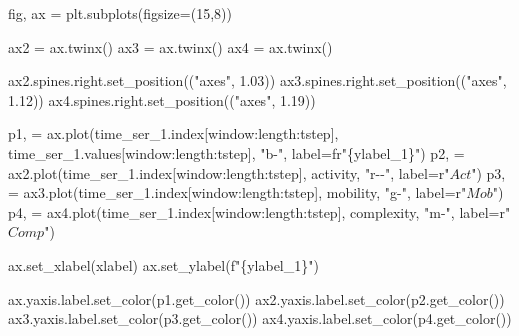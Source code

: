 \documentclass[
  letterpaper,
]{report}
\newenvironment{Shaded}{\begin{snugshade}}{\end{snugshade}}
\newcommand{\DecValTok}[1]{\textcolor[rgb]{0.68,0.00,0.00}{#1}}
\newcommand{\FloatTok}[1]{\textcolor[rgb]{0.68,0.00,0.00}{#1}}
\newcommand{\NormalTok}[1]{\textcolor[rgb]{0.00,0.23,0.31}{#1}}
\newcommand{\OperatorTok}[1]{\textcolor[rgb]{0.37,0.37,0.37}{#1}}
\newcommand{\SpecialCharTok}[1]{\textcolor[rgb]{0.37,0.37,0.37}{#1}}
\newcommand{\SpecialStringTok}[1]{\textcolor[rgb]{0.13,0.47,0.30}{#1}}
\newcommand{\StringTok}[1]{\textcolor[rgb]{0.13,0.47,0.30}{#1}}
\newcommand{\VerbatimStringTok}[1]{\textcolor[rgb]{0.13,0.47,0.30}{#1}}
\begin{document}
\begin{Shaded}
\begin{Highlighting}[]
\NormalTok{fig, ax }\OperatorTok{=}\NormalTok{ plt.subplots(figsize}\OperatorTok{=}\NormalTok{(}\DecValTok{15}\NormalTok{,}\DecValTok{8}\NormalTok{))}

\NormalTok{ax2 }\OperatorTok{=}\NormalTok{ ax.twinx()}
\NormalTok{ax3 }\OperatorTok{=}\NormalTok{ ax.twinx()}
\NormalTok{ax4 }\OperatorTok{=}\NormalTok{ ax.twinx()}

\NormalTok{ax2.spines.right.set\_position((}\StringTok{"axes"}\NormalTok{, }\FloatTok{1.03}\NormalTok{))}
\NormalTok{ax3.spines.right.set\_position((}\StringTok{"axes"}\NormalTok{, }\FloatTok{1.12}\NormalTok{))}
\NormalTok{ax4.spines.right.set\_position((}\StringTok{"axes"}\NormalTok{, }\FloatTok{1.19}\NormalTok{))}

\NormalTok{p1, }\OperatorTok{=}\NormalTok{ ax.plot(time\_ser\_1.index[window:length:tstep], }
\NormalTok{              time\_ser\_1.values[window:length:tstep], }
              \StringTok{"b{-}"}\NormalTok{, label}\OperatorTok{=}\VerbatimStringTok{fr"}\SpecialCharTok{\{}\NormalTok{ylabel\_1}\SpecialCharTok{\}}\VerbatimStringTok{"}\NormalTok{)}
\NormalTok{p2, }\OperatorTok{=}\NormalTok{ ax2.plot(time\_ser\_1.index[window:length:tstep], }
\NormalTok{               activity, }\StringTok{"r{-}{-}"}\NormalTok{, label}\OperatorTok{=}\VerbatimStringTok{r"$Act$"}\NormalTok{)}
\NormalTok{p3, }\OperatorTok{=}\NormalTok{ ax3.plot(time\_ser\_1.index[window:length:tstep], }
\NormalTok{               mobility, }\StringTok{"g{-}"}\NormalTok{, label}\OperatorTok{=}\VerbatimStringTok{r"$Mob$"}\NormalTok{)}
\NormalTok{p4, }\OperatorTok{=}\NormalTok{ ax4.plot(time\_ser\_1.index[window:length:tstep],}
\NormalTok{               complexity, }\StringTok{"m{-}"}\NormalTok{, label}\OperatorTok{=}\VerbatimStringTok{r"$Comp$"}\NormalTok{)}

\NormalTok{ax.set\_xlabel(xlabel)}
\NormalTok{ax.set\_ylabel(}\SpecialStringTok{f"}\SpecialCharTok{\{}\NormalTok{ylabel\_1}\SpecialCharTok{\}}\SpecialStringTok{"}\NormalTok{)}

\NormalTok{ax.yaxis.label.set\_color(p1.get\_color())}
\NormalTok{ax2.yaxis.label.set\_color(p2.get\_color())}
\NormalTok{ax3.yaxis.label.set\_color(p3.get\_color())}
\NormalTok{ax4.yaxis.label.set\_color(p4.get\_color())}


\end{Highlighting}
\end{Shaded}
\end{document}
